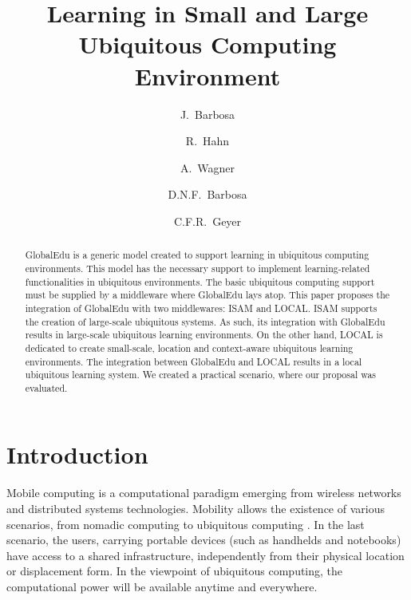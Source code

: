 \documentclass[5p,authoryear]{elsarticle}
\begin{document}
%
%
\title{Learning in Small and Large Ubiquitous Computing Environment}

\author[unisinos]{J.~Barbosa} 

\author[unisinos]{R.~Hahn} 

\author[unisinos]{A.~Wagner} 

\author[unilasalle]{D.N.F.~Barbosa} 

\author[ufrgs]{C.F.R.~Geyer} 

\address[unisinos]{PIPCA/Unisinos, S\~{a}o Leopoldo, RS, Brazil}
\address[unilasalle]{UniLasalle, Canoas, RS, Brazil} 
\address[ufrgs]{UFRGS, Porto Alegre, RS, Brazil}

%
%
\begin{abstract}

GlobalEdu is a generic model created to support learning in ubiquitous
computing environments. This model has the necessary support to implement
learning-related functionalities in ubiquitous environments. The basic
ubiquitous computing support must be supplied by a middleware where GlobalEdu
lays atop. This paper proposes the integration of GlobalEdu with two
middlewares: ISAM and LOCAL. ISAM supports the creation of large-scale
ubiquitous systems. As such, its integration with GlobalEdu results in
large-scale ubiquitous learning environments. On the other hand, LOCAL is
dedicated to create small-scale, location and context-aware ubiquitous
learning environments. The integration between GlobalEdu and LOCAL results in
a local ubiquitous learning system. We created a practical scenario, where our
proposal was evaluated.

\end{abstract}

\maketitle


%
%
\section{Introduction}

Mobile computing is a computational paradigm emerging from wireless networks
and distributed systems technologies. Mobility allows the existence of various
scenarios, from nomadic computing to ubiquitous computing
\citep{weiser91,satyanarayanan01}. In the last scenario, the users, carrying
portable devices (such as handhelds and notebooks) have access to a shared
infrastructure, independently from their physical location or displacement
form. In the viewpoint of ubiquitous computing, the computational power will be
available anytime and everywhere. 
\end{document}
